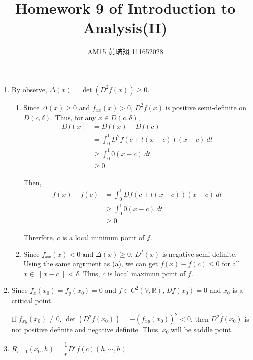 \documentclass[12pt]{article}
\title{Homework 9 of Introduction to Analysis(II)}
\author{AM15 黃琦翔 111652028}
\begin{document}
\maketitle
\begin{enumerate}
    \item By observe, $\Delta(x) = \det(D^2f(x))\geq 0$.
    \begin{enumerate}
        \item Since $\Delta(x) \geq 0$ and $f_{xx}(x) > 0$, $D^2f(x)$ is positive semi-definite on $D(c, \delta)$.
        Thus, for any $x \in D(c, \delta)$, \begin{align*}
            Df(x) &= Df(x) - Df(c)\\
            &= \int_{0}^{1} D^2f(c+t(x-c))(x-c)\ dt\\
            &\geq \int_{0}^{1} 0(x-c)\ dt\\
            &\geq 0
        \end{align*}
        
        Then, \begin{align*}
            f(x) - f(c) &= \int_{0}^1 Df(c + t(x-c))(x-c)\ dt\\
            &\geq \int_{0}^{1} 0(x-c)\ dt\\
            &\geq 0
        \end{align*}

        Threrfore, $c$ is a local minimun point of $f$. 

        \item Since $f_{xx}(x) < 0$ and $\Delta(x) \geq 0$, $D^f(x)$ is negative semi-definite.
        Using the same argument as (a), we can get $f(x) - f(c) \leq 0$ for all $x\in \| x-c\| < \delta$.
        Thus, $c$ is local maximun point of $f$.

    \end{enumerate}

    \item Since $f_x(x_0) = f_y(x_0) = 0$ and $f \in C^2(V, \mathbb{R})$, $Df(x_0) = 0$ and $x_0$ is a critical point.
    
    If $f_{xy}(x_0)\neq 0$, $\det(D^2f(x_0)) = - (f_{xy}(x_0))^2 < 0$, then $D^2f(x_0)$ is not positive definite and negative definite.
    Thus, $x_0$ will be saddle point.

    \item $R_{r-1}(x_0, h) = \dfrac{1}{r}D^rf(c)(h, \cdots, h)$
\end{enumerate}
\end{document}
